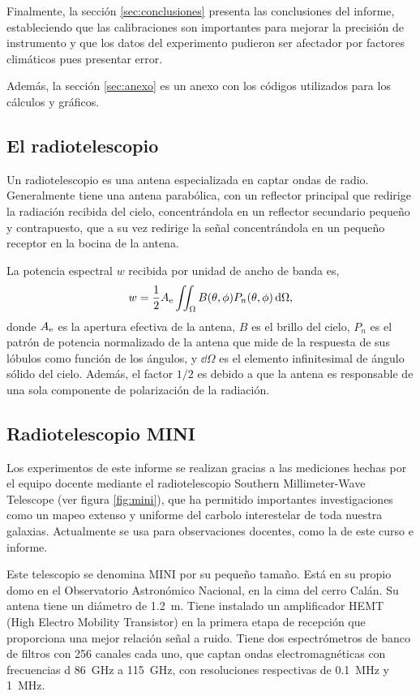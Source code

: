 Finalmente, la sección \ref{sec:conclusiones} presenta las conclusiones del informe, estableciendo que las calibraciones son importantes para mejorar la precisión de instrumento y que los datos del experimento pudieron ser afectador por factores climáticos pues presentar error.

Además, la sección \ref{sec:anexo} es un anexo con los códigos utilizados para los cálculos y gráficos.

\subsection{El radiotelescopio}\label{sec:radiotelescopio}

Un radiotelescopio es una antena especializada en captar ondas de radio. Generalmente tiene una antena parabólica, con un reflector principal que redirige la radiación recibida del cielo, concentrándola en un reflector secundario pequeño y contrapuesto, que a su vez redirige la señal concentrándola en un pequeño receptor en la bocina de la antena.

La potencia espectral $w$ recibida por unidad de ancho de banda es,
\begin{equation}
w=\frac{1}{2}A_\textnormal{e}\iint_\Omega{B(\theta,\phi)P_n(\theta,\phi)\dd{\Omega}}\label{eq:w}
	,\end{equation}
donde $A_\textnormal{e}$ es la apertura efectiva de la antena, $B$ es el brillo del cielo, $P_n$ es el patrón de potencia normalizado de la antena que mide de la respuesta de sus lóbulos como función de los ángulos, y $\dd{\Omega}$ es el elemento infinitesimal de ángulo sólido del cielo. Además, el factor $1/2$ es debido a que la antena es responsable de una sola componente de polarización de la radiación.

\subsection{Radiotelescopio MINI}\label{sec:mini}

Los experimentos de este informe se realizan gracias a las mediciones hechas por el equipo docente mediante el radiotelescopio Southern Millimeter-Wave Telescope (ver figura \ref{fig:mini}), que ha permitido importantes investigaciones como un mapeo extenso y uniforme del carbolo interestelar de toda nuestra galaxias. Actualmente se usa para observaciones docentes, como la de este curso e informe.

Este telescopio se denomina MINI por su pequeño tamaño. Está en su propio domo en el Observatorio Astronómico Nacional, en la cima del cerro Calán. Su antena tiene un diámetro de \SI{1.2}{\meter}. Tiene instalado un amplificador HEMT (High Electro Mobility Transistor) en la primera etapa de recepción que proporciona una mejor relación señal a ruido. Tiene dos espectrómetros de banco de filtros con 256 canales cada uno, que captan ondas electromagnéticas con frecuencias d \SI{86}{\giga\hertz} a \SI{115}{\giga\hertz}, con resoluciones respectivas de \SI{0.1}{\mega\hertz} y \SI{1}{\mega\hertz}.

